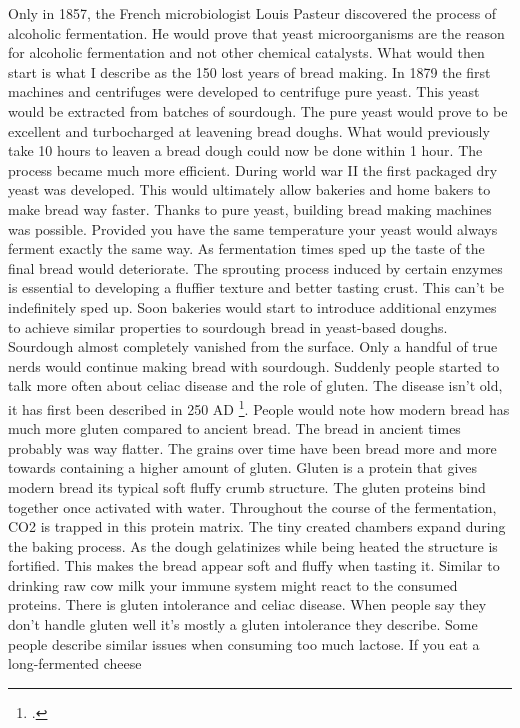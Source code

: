 Only in 1857, the French microbiologist Louis Pasteur discovered
the process of alcoholic fermentation. He would prove that
yeast microorganisms are the reason for alcoholic fermentation
and not other chemical catalysts. What would then start is
what I describe as the 150 lost years of bread making. In 1879
the first machines and centrifuges were developed to centrifuge
pure yeast. This yeast would be extracted from batches of sourdough.
The pure yeast would prove to be excellent and turbocharged
at leavening bread doughs. What would previously take 10 hours
to leaven a bread dough could now be done within 1 hour.
The process became much more efficient. During world war II
the first packaged dry yeast was developed. This would ultimately
allow bakeries and home bakers to make bread way faster.
Thanks to pure yeast, building bread making machines was
possible. Provided you have the same temperature your yeast
would always ferment exactly the same way. As fermentation
times sped up the taste of the final bread would deteriorate.
The sprouting process induced by certain enzymes is essential
to developing a fluffier texture and better tasting crust. This
can't be indefinitely sped up. Soon bakeries would start
to introduce additional enzymes to achieve similar properties
to sourdough bread in yeast-based doughs. Sourdough almost
completely vanished from the surface. Only a handful
of true nerds would continue making bread with sourdough.
Suddenly people started to talk more often about celiac disease
and the role of gluten. The disease isn't old, it has first
been described in 250 AD \footcite{coeliac+disease}. People
would note how modern bread has much more gluten compared
to ancient bread. The bread in ancient times probably was way flatter.
The grains over time have been bread more and more towards containing a higher
amount of gluten. Gluten is a protein that gives modern
bread its typical soft fluffy crumb structure. The
gluten proteins bind together once activated with water.
Throughout the course of the fermentation, CO2 is trapped
in this protein matrix. The tiny created chambers expand
during the baking process. As the dough gelatinizes while
being heated the structure is fortified. This makes the bread appear
soft and fluffy when tasting it. Similar to drinking
raw cow milk your immune system might react to
the consumed proteins. There is gluten intolerance
and celiac disease. When people say they don't handle
gluten well it's mostly a gluten intolerance they describe.
Some people describe similar issues when consuming
too much lactose. If you eat a long-fermented cheese
